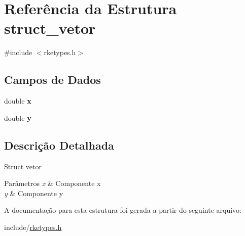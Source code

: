 \hypertarget{structstruct__vetor}{\section{Referência da Estrutura struct\-\_\-vetor}
\label{structstruct__vetor}
}


{\ttfamily \#include $<$rketypes.\-h$>$}

\subsection*{Campos de Dados}
\begin{DoxyCompactItemize}
\item 
\hypertarget{structstruct__vetor_af88b946fb90d5f08b5fb740c70e98c10}{double {\bfseries x}}\label{structstruct__vetor_af88b946fb90d5f08b5fb740c70e98c10}

\item 
\hypertarget{structstruct__vetor_ab927965981178aa1fba979a37168db2a}{double {\bfseries y}}\label{structstruct__vetor_ab927965981178aa1fba979a37168db2a}

\end{DoxyCompactItemize}


\subsection{Descrição Detalhada}
Struct vetor 
\begin{DoxyParams}{Parâmetros}
{\em x} & Componente x \\
\hline
{\em y} & Componente y \\
\hline
\end{DoxyParams}


A documentação para esta estrutura foi gerada a partir do seguinte arquivo\-:\begin{DoxyCompactItemize}
\item 
include/\hyperlink{rketypes_8h}{rketypes.\-h}\end{DoxyCompactItemize}
